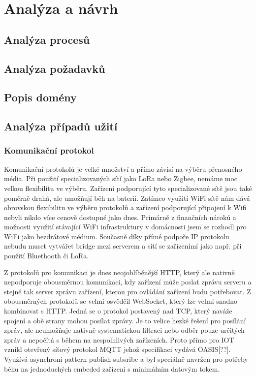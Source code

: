 \documentclass[thesis=B,czech]{FITthesis}[2019/12/23]
\begin{document}
\chapter{Analýza a návrh}

\section{Analýza procesů}

\section{Analýza požadavků}

\section{Popis domény}

\section{Analýza případů užití}


\subsection{Komunikační protokol}   %
Komunikační protokolů je velké množství a přímo závisí na výběru přenosného média. Při použití specializovaných sítí jako LoRa nebo Zigbee, nemáme moc velkou flexibilitu ve výběru. Zařízení podporující tyto specializované sítě jsou také poměrně drahá, ale umožňují běh na baterii. Zatímco využití WiFi sítě nám dává obrovskou flexibilitu ve výběru protokolů a zařízení podporující připojení k Wifi nebyli nikdo více cenově dostupné jako dnes. Primárně z finančních nároků a možnosti využití stávající WiFi infrastruktury v domácnosti jsem se rozhodl pro WiFi jako bezdrátové médium. Současně díky přímé podpoře IP protokolu nebudu muset vytvářet bridge mezi serverem a sítí se zařízenímí jako např. při použití Bluethooth či LoRa.

Z protokolů pro komunikaci je dnes neojoblíběnější HTTP, který ale nativně nepodporuje obousměrnou komunikaci, kdy zařízení může poslat zprávu serveru a stejně tak server zprávu zařízení, kterou pro ovládání zařízení budu potřebovat. Z obousměrných protokolů se velmi osvědčil WebSocket, který lze velmi snadno kombinovat s HTTP. Jedná se o protokol postavený nad TCP, který naváže spojení a obě strany mohou posílat zprávy. Je to velice hezké řešení pro posílání zpráv, ale neumožňuje nativně systematickou filtraci nebo odběr pouze určitých zpráv a nepočítá s během na nespolhlivých zařízeních. Proto přímo pro IOT vznikl otevřený síťový protokol MQTT jehož specifikaci vydává OASIS[??]. Využívá asynchroní pattern publish-subsribe a byl speciálně navržen pro potřeby běhu na jednoduchých embeded zařízení s minimálním datovým tokem.
\end{document}

